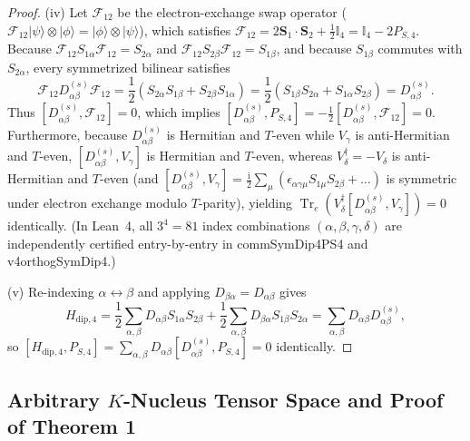 \documentclass[onecolumn,10pt,notitlepage,amsmath,amssymb,floatfix]{revtex4-2}
\theoremstyle{plain}
\theoremstyle{definition}
\newcommand{\ii}{\mathrm{i}}
\newcommand{\Tr}{\operatorname{Tr}}
\newcommand{\leanid}[1]{{\footnotesize\ttfamily\def\_{\textunderscore\allowbreak}#1}}
\begin{document}
\begin{proof}
(iv) Let $\mathcal{F}_{12}$ be the electron-exchange swap operator ($\mathcal{F}_{12}|\psi\rangle\otimes|\phi\rangle = |\phi\rangle\otimes|\psi\rangle$), which satisfies $\mathcal{F}_{12} = 2\mathbf{S}_1\cdot\mathbf{S}_2 + \frac{1}{2}\mathbb{I}_4 = \mathbb{I}_4 - 2P_{S,4}$. Because $\mathcal{F}_{12} S_{1\alpha}\mathcal{F}_{12} = S_{2\alpha}$ and $\mathcal{F}_{12} S_{2\beta}\mathcal{F}_{12} = S_{1\beta}$, and because $S_{1\beta}$ commutes with $S_{2\alpha}$, every symmetrized bilinear satisfies
\[
\mathcal{F}_{12} D^{(s)}_{\alpha\beta} \mathcal{F}_{12}
= \frac{1}{2}(S_{2\alpha}S_{1\beta} + S_{2\beta}S_{1\alpha})
= \frac{1}{2}(S_{1\beta}S_{2\alpha} + S_{1\alpha}S_{2\beta})
= D^{(s)}_{\alpha\beta}.
\]
Thus $[D^{(s)}_{\alpha\beta}, \mathcal{F}_{12}] = 0$, which implies $[D^{(s)}_{\alpha\beta}, P_{S,4}] = -\frac{1}{2}[D^{(s)}_{\alpha\beta}, \mathcal{F}_{12}] = 0$. Furthermore, because $D^{(s)}_{\alpha\beta}$ is Hermitian and $T$-even while $V_\gamma$ is anti-Hermitian and $T$-even, $[D^{(s)}_{\alpha\beta}, V_\gamma]$ is Hermitian and $T$-even, whereas $V_\delta^\dagger = -V_\delta$ is anti-Hermitian and $T$-even (and $[D^{(s)}_{\alpha\beta}, V_\gamma] = \frac{\ii}{2}\sum_\mu (\epsilon_{\alpha\gamma\mu}S_{1\mu}S_{2\beta} + \dots)$ is symmetric under electron exchange modulo $T$-parity), yielding $\Tr_e(V_\delta^\dagger [D^{(s)}_{\alpha\beta}, V_\gamma]) = 0$ identically. (In Lean~4, all $3^4 = 81$ index combinations $(\alpha,\beta,\gamma,\delta)$ are independently certified entry-by-entry in \leanid{comm\_SymDip4\_PS4} and \leanid{v4\_orthog\_SymDip4}.)

(v) Re-indexing $\alpha \leftrightarrow \beta$ and applying $D_{\beta\alpha} = D_{\alpha\beta}$ gives
\[
H_{\mathrm{dip},4}
= \frac{1}{2}\sum_{\alpha,\beta} D_{\alpha\beta} S_{1\alpha} S_{2\beta} + \frac{1}{2}\sum_{\alpha,\beta} D_{\beta\alpha} S_{1\beta} S_{2\alpha}
= \sum_{\alpha,\beta} D_{\alpha\beta} D^{(s)}_{\alpha\beta},
\]
so $[H_{\mathrm{dip},4}, P_{S,4}] = \sum_{\alpha,\beta} D_{\alpha\beta} [D^{(s)}_{\alpha\beta}, P_{S,4}] = 0$ identically.
\end{proof}

\subsection{Arbitrary \texorpdfstring{$K$}{K}-Nucleus Tensor Space and Proof of Theorem 1}
\label{subsec:S1_thm1}
\end{document}
